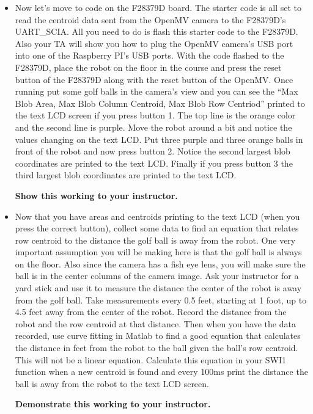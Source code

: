 \documentclass[11pt]{article}
\begin{document}
\begin{itemize}
    \item Now let’s move to code on the F28379D board. The starter code is all set to read the centroid data sent from the OpenMV camera to the F28379D’s UART\_SCIA. All you need to do is flash this starter code to the F28379D. Also your TA will show you how to plug the OpenMV camera’s USB port into one of the Raspberry PI’s USB ports. With the code flashed to the F28379D, place the robot on the floor in the course and press the reset button of the F28379D along with the reset button of the OpenMV. Once running put some golf balls in the camera’s view and you can see the “Max Blob Area, Max Blob Column Centroid, Max Blob Row Centriod” printed to the text LCD screen if you press button 1. The top line is the orange color and the second line is purple. Move the robot around a bit and notice the values changing on the text LCD. Put three purple and three orange balls in front of the robot and now press button 2. Notice the second largest blob coordinates are printed to the text LCD. Finally if you press button 3 the third largest blob coordinates are printed to the text LCD.
        \begin{checkoff}
                \textbf{Show this working to your instructor.}
        \end{checkoff}
    \item Now that you have areas and centroids printing to the text LCD (when you press the correct button), collect some data to find an equation that relates row centroid to the distance the golf ball is away from the robot. One very important assumption you will be making here is that the golf ball is always on the floor. Also since the camera has a fish eye lens, you will make sure the ball is in the center columns of the camera image. Ask your instructor for a yard stick and use it to measure the distance the center of the robot is away from the golf ball. Take measurements every 0.5 feet, starting at 1 foot, up to 4.5 feet away from the center of the robot. Record the distance from the robot and the row centroid at that distance. Then when you have the data recorded, use curve fitting in Matlab to find a good equation that calculates the distance in feet from the robot to the ball given the ball’s row centroid. This will not be a linear equation. Calculate this equation in your SWI1 function when a new centroid is found and every 100ms print the distance the ball is away from the robot to the text LCD screen.
        \begin{checkoff}
                \textbf{Demonstrate this working to your instructor.}
        \end{checkoff}
\end{itemize}
\end{document}
